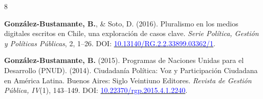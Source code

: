 \begin{publications}
\begin{benumerate}{8}

\item{{\bfseries González-Bustamante, B.}, \& Soto, D. (2016). Pluralismo en los medios digitales escritos en Chile, una exploración de casos clave. {\itshape Serie Política, Gestión y Políticas Públicas}, 2, 1--26. DOI: \href{http://doi.org/10.13140/RG.2.2.33899.03362/1}{\textcolor{blue}{10.13140/RG.2.2.33899.03362/1}}.}\vspace{1mm} %


\item{{\bfseries González-Bustamante, B.} (2015). Programas de Naciones Unidas para el Desarrollo (PNUD). (2014). Ciudadanía Política: Voz y Participación Ciudadana en América Latina. Buenos Aires: Siglo Veintiuno Editores. {\itshape Revista de Gestión Pública, IV}(1), 143--149. DOI: \href{https://doi.org/10.22370/rgp.2015.4.1.2240}{\textcolor{blue}{10.22370/rgp.2015.4.1.2240}}.}

\end{benumerate}

\end{publications}





